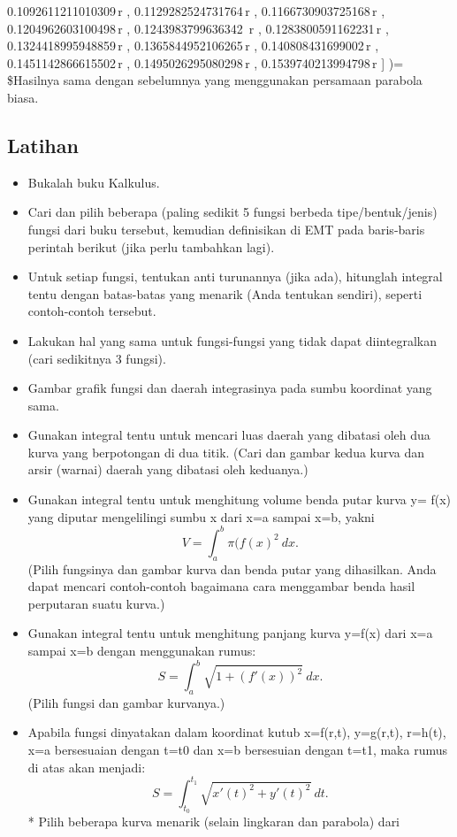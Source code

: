 \documentclass[
]{book}
\begin{document}
0.1092611211010309\,r , 0.1129282524731764\,r ,   0.1166730903725168\,r , 0.1204962603100498\,r , 0.1243983799636342\,  r , 0.1283800591162231\,r , 0.1324418995948859\,r ,   0.1365844952106265\,r , 0.140808431699002\,r , 0.1451142866615502\,r   , 0.1495026295080298\,r , 0.1539740213994798\,r \right] \right)=  \)\$Hasilnya sama dengan sebelumnya yang menggunakan persamaan parabola biasa.

\subsection{Latihan}\label{latihan-5}

\begin{itemize}
\item
  Bukalah buku Kalkulus.
\item
  Cari dan pilih beberapa (paling sedikit 5 fungsi berbeda tipe/bentuk/jenis) fungsi dari buku tersebut, kemudian definisikan di EMT pada baris-baris perintah berikut (jika perlu tambahkan lagi).
\item
  Untuk setiap fungsi, tentukan anti turunannya (jika ada), hitunglah integral tentu dengan batas-batas yang menarik (Anda tentukan sendiri), seperti contoh-contoh tersebut.
\item
  Lakukan hal yang sama untuk fungsi-fungsi yang tidak dapat diintegralkan (cari sedikitnya 3 fungsi).
\item
  Gambar grafik fungsi dan daerah integrasinya pada sumbu koordinat yang sama.
\item
  Gunakan integral tentu untuk mencari luas daerah yang dibatasi oleh dua kurva yang berpotongan di dua titik. (Cari dan gambar kedua kurva dan arsir (warnai) daerah yang dibatasi oleh keduanya.)
\item
  Gunakan integral tentu untuk menghitung volume benda putar kurva y= f(x) yang diputar mengelilingi sumbu x dari x=a sampai x=b, yakni \[V = \int_a^b \pi (f(x)^2\ dx.\](Pilih fungsinya dan gambar kurva dan benda putar yang dihasilkan. Anda dapat mencari contoh-contoh bagaimana cara menggambar benda hasil perputaran suatu kurva.)
\item
  Gunakan integral tentu untuk menghitung panjang kurva y=f(x) dari x=a sampai x=b dengan menggunakan rumus: \[S = \int_a^b \sqrt{1+(f'(x))^2} \ dx.\](Pilih fungsi dan gambar kurvanya.)
\item
  Apabila fungsi dinyatakan dalam koordinat kutub x=f(r,t), y=g(r,t), r=h(t), x=a bersesuaian dengan t=t0 dan x=b bersesuian dengan t=t1, maka rumus di atas akan menjadi: \[S=\int_{t_0}^{t_1} \sqrt{x'(t)^2+y'(t)^2}\ dt.\]* Pilih beberapa kurva menarik (selain lingkaran dan parabola) dari

\end{itemize}
\end{document}
